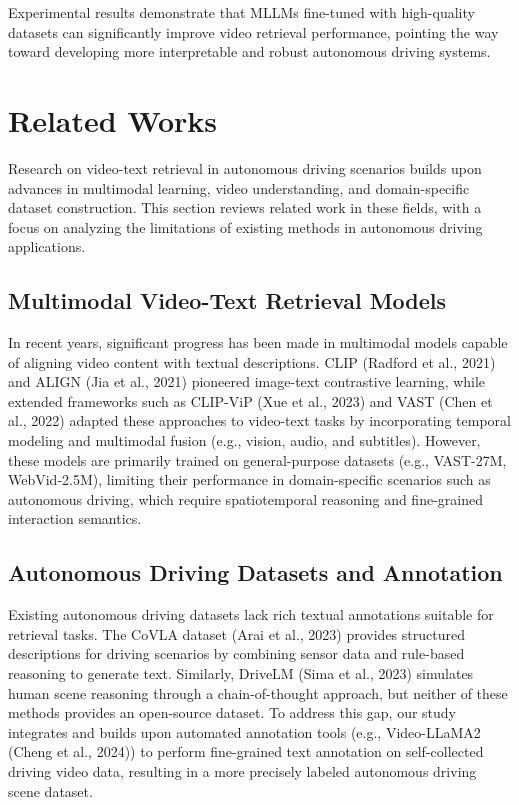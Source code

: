 \documentclass[lettersize,journal]{IEEEtran}
\begin{document}
Experimental results demonstrate that MLLMs fine-tuned with high-quality datasets can significantly improve video retrieval performance, pointing the way toward developing more interpretable and robust autonomous driving systems.

\section{Related Works}
Research on video-text retrieval in autonomous driving scenarios builds upon advances in multimodal learning, video understanding, and domain-specific dataset construction. This section reviews related work in these fields, with a focus on analyzing the limitations of existing methods in autonomous driving applications.

\subsection{Multimodal Video-Text Retrieval Models}
In recent years, significant progress has been made in multimodal models capable of aligning video content with textual descriptions. CLIP (Radford et al., 2021)\cite{radford2021learning}
 and ALIGN (Jia et al., 2021)\cite{jia2021scaling} pioneered image-text contrastive learning, while extended frameworks such as CLIP-ViP (Xue et al., 2023)\cite{xue2022clipvip} and VAST (Chen et al., 2022)\cite{chen2023vast} adapted these approaches to video-text tasks by incorporating temporal modeling and multimodal fusion (e.g., vision, audio, and subtitles). However, these models are primarily trained on general-purpose datasets (e.g., VAST-27M\cite{chen2023vast}, WebVid-2.5M\cite{bain2021frozen}), limiting their performance in domain-specific scenarios such as autonomous driving, which require spatiotemporal reasoning and fine-grained interaction semantics.

\subsection{Autonomous Driving Datasets and Annotation}
Existing autonomous driving datasets lack rich textual annotations suitable for retrieval tasks. The CoVLA dataset (Arai et al., 2023)\cite{arai2024covla} provides structured descriptions for driving scenarios by combining sensor data and rule-based reasoning to generate text. Similarly, DriveLM (Sima et al., 2023)\cite{sima2023drivelm} simulates human scene reasoning through a chain-of-thought approach, but neither of these methods provides an open-source dataset. To address this gap, our study integrates and builds upon automated annotation tools (e.g., Video-LLaMA2 (Cheng et al., 2024)\cite{cheng2024videollama}) to perform fine-grained text annotation on self-collected driving video data, resulting in a more precisely labeled autonomous driving scene dataset.
\end{document}
